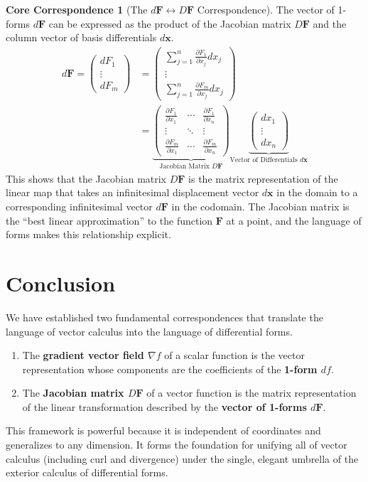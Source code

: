 \documentclass[12pt, letterpaper]{article}
\theoremstyle{definition}
\newtheorem{idea}{Core Correspondence}[section]
\begin{document}
	\begin{idea}[The $d\mathbf{F} \longleftrightarrow D\mathbf{F}$ Correspondence]
		The vector of 1-forms $d\mathbf{F}$ can be expressed as the product of the Jacobian matrix $D\mathbf{F}$ and the column vector of basis differentials $d\mathbf{x}$.
		\begin{align*}
			d\mathbf{F} = \begin{pmatrix} dF_1 \\ \vdots \\ dF_m \end{pmatrix}
			&= \begin{pmatrix} \sum_{j=1}^n \frac{\partial F_1}{\partial x_j} dx_j \\ \vdots \\ \sum_{j=1}^n \frac{\partial F_m}{\partial x_j} dx_j \end{pmatrix} \\
			&= \underbrace{
				\begin{pmatrix}
					\frac{\partial F_1}{\partial x_1} & \cdots & \frac{\partial F_1}{\partial x_n} \\
					\vdots & \ddots & \vdots \\
					\frac{\partial F_m}{\partial x_1} & \cdots & \frac{\partial F_m}{\partial x_n}
				\end{pmatrix}
			}_{\text{Jacobian Matrix } D\mathbf{F}}
			\underbrace{
				\begin{pmatrix} dx_1 \\ \vdots \\ dx_n \end{pmatrix}
			}_{\text{Vector of Differentials } d\mathbf{x}}
		\end{align*}
		This shows that the Jacobian matrix $D\mathbf{F}$ is the matrix representation of the linear map that takes an infinitesimal displacement vector $d\mathbf{x}$ in the domain to a corresponding infinitesimal vector $d\mathbf{F}$ in the codomain. The Jacobian matrix is the ``best linear approximation'' to the function $\mathbf{F}$ at a point, and the language of forms makes this relationship explicit.
	\end{idea}
	
	\section{Conclusion}
	We have established two fundamental correspondences that translate the language of vector calculus into the language of differential forms.
	\begin{enumerate}
		\item The \textbf{gradient vector field $\nabla f$} of a scalar function is the vector representation whose components are the coefficients of the \textbf{1-form $df$}.
		\item The \textbf{Jacobian matrix $D\mathbf{F}$} of a vector function is the matrix representation of the linear transformation described by the \textbf{vector of 1-forms $d\mathbf{F}$}.
	\end{enumerate}
	This framework is powerful because it is independent of coordinates and generalizes to any dimension. It forms the foundation for unifying all of vector calculus (including curl and divergence) under the single, elegant umbrella of the exterior calculus of differential forms.
	
\end{document}
